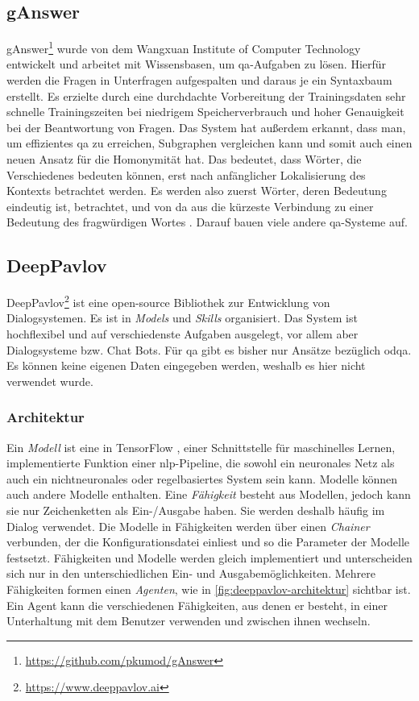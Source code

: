 \subsection{gAnswer}

gAnswer\footnote{\url{https://github.com/pkumod/gAnswer}} \citep{ganswer2} wurde von dem Wangxuan Institute of Computer Technology entwickelt und arbeitet mit Wissensbasen, um \acl{qa}-Aufgaben zu lösen.
Hierfür werden die Fragen in Unterfragen aufgespalten und daraus je ein Syntaxbaum erstellt.
Es erzielte durch eine durchdachte Vorbereitung der Trainingsdaten sehr schnelle Trainingszeiten bei niedrigem Speicherverbrauch und hoher Genauigkeit bei der Beantwortung von Fragen.
Das System hat außerdem erkannt, dass man, um effizientes \acl{qa} zu erreichen, Subgraphen vergleichen kann und somit auch einen neuen Ansatz für die Homonymität hat.
Das bedeutet, dass Wörter, die Verschiedenes bedeuten können, erst nach anfänglicher Lokalisierung des Kontexts betrachtet werden.
Es werden also zuerst Wörter, deren Bedeutung eindeutig ist, betrachtet, und von da aus die kürzeste Verbindung zu einer Bedeutung des fragwürdigen Wortes \citep{ganswerapproach}.
Darauf bauen viele andere \ac{qa}-Systeme auf.

\subsection{DeepPavlov}
DeepPavlov\footnote{\url{https://www.deeppavlov.ai}} \citep{deeppavlov} ist eine open-source Bibliothek zur Entwicklung von Dialogsystemen.
Es ist in \emph{Models} und \emph{Skills} organisiert.
Das System ist hochflexibel und auf verschiedenste Aufgaben ausgelegt, vor allem aber Dialogsysteme bzw. Chat Bots.
Für \ac{qa} gibt es bisher nur Ansätze bezüglich \ac{odqa}.
Es können keine eigenen Daten eingegeben werden, weshalb es hier nicht verwendet wurde.

\subsubsection{Architektur}
Ein \emph{Modell} ist eine in TensorFlow \citep{tensorflow}, einer Schnittstelle für maschinelles Lernen, implementierte Funktion einer \ac{nlp}-Pipeline,
die sowohl ein neuronales Netz als auch ein nichtneuronales oder regelbasiertes System sein kann.
Modelle können auch andere Modelle enthalten.
Eine \emph{Fähigkeit} besteht aus Modellen, jedoch kann sie nur Zeichenketten als Ein-/Ausgabe haben.
Sie werden deshalb häufig im Dialog verwendet.
Die Modelle in Fähigkeiten werden über einen \emph{Chainer} verbunden, der die Konfigurationsdatei einliest und so die Parameter der Modelle festsetzt.
Fähigkeiten und Modelle werden gleich implementiert und unterscheiden sich nur in den unterschiedlichen Ein- und Ausgabemöglichkeiten.
Mehrere Fähigkeiten formen einen \emph{Agenten}, wie in \cref{fig:deeppavlov-architektur} sichtbar ist.
Ein Agent kann die verschiedenen Fähigkeiten, aus denen er besteht, in einer Unterhaltung mit dem Benutzer verwenden und zwischen ihnen wechseln.

